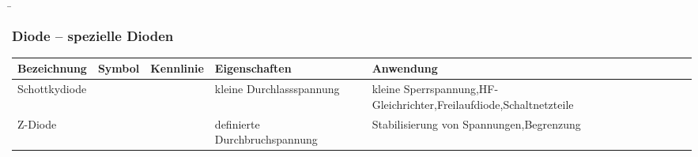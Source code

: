 \begin{frame}
    \b{
        \frametitle{Diode -- spezielle Dioden}
        \begin{table}[H]
            \centering 
            \begin{tabular}{ |p{2.1cm}|p{1.4cm}|p{3.2cm}|p{2.8cm}|p{3cm}| }
                \hline
                \textbf{Bezeichnung} & \textbf{Symbol} & \textbf{Kennlinie} & \textbf{Eigenschaften} & \textbf{Anwendung} \\
                \hline
                Schottky\-diode
                &
                \begin{minipage}[t][2.6cm][c]{1.4cm}
                    \centering 
                \end{minipage}
                & 
                \begin{minipage}[t][2.6cm][c]{3.3cm}
                    \centering 
                \end{minipage}
                & 
                 kleine Durchlassspannung &
                 kleine Sperrspannung,\newline HF-Gleichrichter,\newline Freilaufdiode,\newline Schaltnetzteile\\
                \hline
                Z-Diode
                &
                \begin{minipage}[t][2.6cm][c]{1.4cm}
                    \centering 
                \end{minipage}
                & 
                \begin{minipage}[t][2.6cm][c]{3.3cm}
                    \centering 
                \end{minipage}
                & 
                definierte Durchbruchspannung &
                Stabilisierung von Spannungen,\newline Begrenzung\\
                \hline
            \end{tabular}
        \end{table}
    }

\end{frame}

